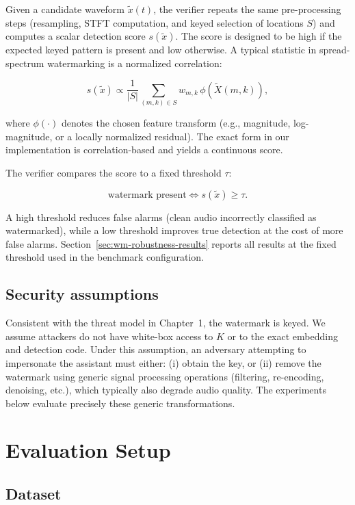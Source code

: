 Given a candidate waveform $\tilde{x}(t)$, the verifier repeats the same
pre-processing steps (resampling, STFT computation, and keyed selection of
locations $S$) and computes a scalar detection score $s(\tilde{x})$. The score is
designed to be high if the expected keyed pattern is present and low otherwise.
A typical statistic in spread-spectrum watermarking is a normalized correlation:

\[
s(\tilde{x}) \propto \frac{1}{|S|}\sum_{(m,k)\in S} w_{m,k}\,\phi(\tilde{X}(m,k)),
\]

where $\phi(\cdot)$ denotes the chosen feature transform (e.g., magnitude,
log-magnitude, or a locally normalized residual). The exact form in our
implementation is correlation-based and yields a continuous score.

The verifier compares the score to a fixed threshold $\tau$:

\[
\text{watermark present} \iff s(\tilde{x}) \ge \tau.
\]

A high threshold reduces false alarms (clean audio incorrectly classified as
watermarked), while a low threshold improves true detection at the cost of more
false alarms. Section~\ref{sec:wm-robustness-results} reports all results at the
fixed threshold used in the benchmark configuration.

\subsection{Security assumptions}
\label{subsec:wm-assumptions}

Consistent with the threat model in Chapter~1, the watermark is keyed. We assume
attackers do not have white-box access to $K$ or to the exact embedding and
detection code. Under this assumption, an adversary attempting to impersonate
the assistant must either: (i) obtain the key, or (ii) remove the watermark using
generic signal processing operations (filtering, re-encoding, denoising, etc.),
which typically also degrade audio quality. The experiments below evaluate
precisely these generic transformations.

\section{Evaluation Setup}
\label{sec:wm-eval-setup}

\subsection{Dataset}
\label{subsec:wm-dataset}

